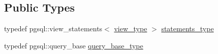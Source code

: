 \subsection*{Public Types}
\begin{DoxyCompactItemize}
\item 
typedef pgsql\+::view\+\_\+statements$<$ \hyperlink{classodb_1_1access_1_1view__traits_3_01_1_1_graph_id_view_by_object_class_01_4_a66d9fb52e7d3f5dacaeb5ce514900eea}{view\+\_\+type} $>$ \hyperlink{classodb_1_1access_1_1view__traits__impl_3_01_1_1_graph_id_view_by_object_class_00_01id__pgsql_01_4_a7dc1c9dff4f83109295ec06e0d29e527}{statements\+\_\+type}
\item 
typedef pgsql\+::query\+\_\+base \hyperlink{classodb_1_1access_1_1view__traits__impl_3_01_1_1_graph_id_view_by_object_class_00_01id__pgsql_01_4_a1396a7bdbbd8fed65dd070b1579e2822}{query\+\_\+base\+\_\+type}
\end{DoxyCompactItemize}
